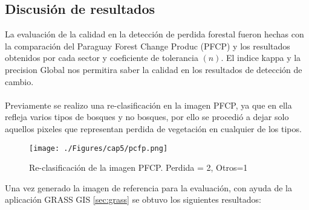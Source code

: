\subsection{Discusi\'on de resultados}
La evaluaci\'on de la calidad en la detecci\'on de perdida forestal fueron hechas con la comparaci\'on del Paraguay Forest Change Produc (PFCP) y los resultados obtenidos por cada sector y coeficiente de tolerancia $ (n) $. El indice kappa y la precision Global nos permitira saber la calidad en los resultados de detecci\'on de cambio.\\~\\
Previamente se realizo una re-clasificaci\'on en la imagen PFCP, ya que en ella refleja varios tipos de bosques y no bosques, por ello se procedi\'o a dejar solo aquellos pixeles que representan perdida de vegetaci\'on en cualquier de los tipos.
\begin{figure}[H]
	\centering
	\texttt{[image: ./Figures/cap5/pcfp.png]}
	\caption{Re-clasificaci\'on de la imagen PFCP. Perdida = 2, Otros=1}
	\label{fig:pfcp}
\end{figure}
Una vez generado la imagen de referencia para la evaluaci\'on, con ayuda de la aplicaci\'on GRASS GIS \ref{sec:grass} se obtuvo los siguientes resultados:
